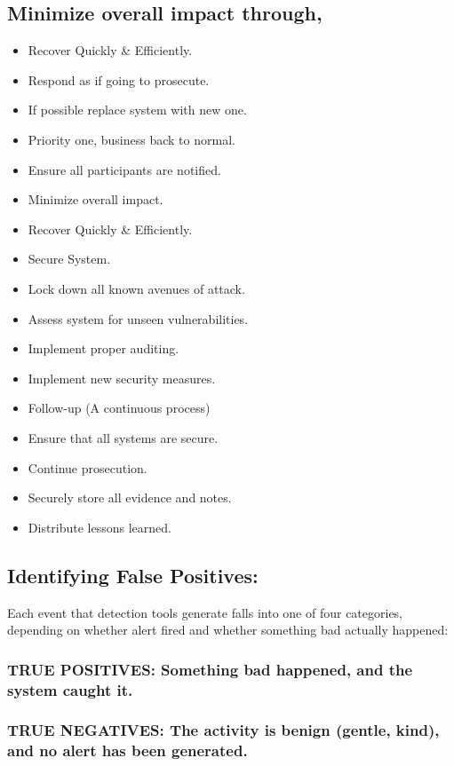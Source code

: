 \documentclass[british]{article}
\begin{document}
\subsection{Minimize overall impact through,}
\begin{itemize}
	\item Recover Quickly \& Efficiently.
	\item Respond as if going to prosecute.
	\item If possible replace system with new one.
	\item Priority one, business back to normal.
	\item Ensure all participants are notified.
	\item Minimize overall impact.
	\item Recover Quickly \& Efficiently.
	\item Secure System.
	\item Lock down all known avenues of attack.
	\item Assess system for unseen vulnerabilities.
	\item Implement proper auditing.
	\item Implement new security measures.
	\item Follow-up (A continuous process)
	\item Ensure that all systems are secure.
	\item Continue prosecution.
	\item Securely store all evidence and notes.
	\item Distribute lessons learned.
\end{itemize}

\subsection{Identifying False Positives:}

Each event that detection tools generate falls into one of four categories,
depending on whether alert fired and whether something bad actually
happened:

\subsubsection{TRUE POSITIVES: Something bad happened, and the system caught it.}

\subsubsection{TRUE NEGATIVES: The activity is benign (gentle, kind), and no alert
	has been generated.}
\end{document}

